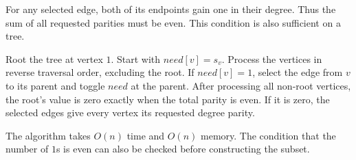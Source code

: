 For any selected edge, both of its endpoints gain one in their degree. Thus
the sum of all requested parities must be even. This condition is also
sufficient on a tree.

Root the tree at vertex $1$. Start with $need[v]=s_v$. Process the vertices in
reverse traversal order, excluding the root. If $need[v]=1$, select the edge
from $v$ to its parent and toggle $need$ at the parent. After processing all
non-root vertices, the root's value is zero exactly when the total parity is
even. If it is zero, the selected edges give every vertex its requested
degree parity.

The algorithm takes $O(n)$ time and $O(n)$ memory. The condition that the
number of $1$s is even can also be checked before constructing the subset.
